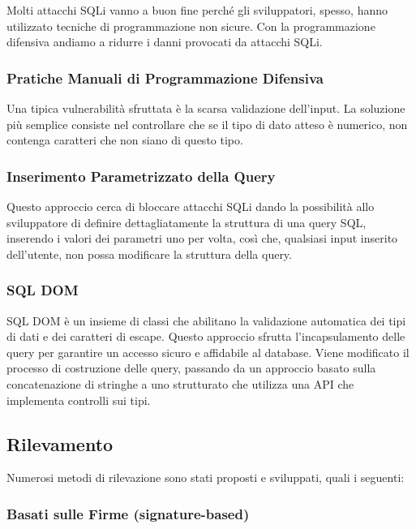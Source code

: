 Molti attacchi SQLi vanno a buon fine perché gli sviluppatori, spesso, hanno utilizzato tecniche di programmazione non sicure. Con la programmazione difensiva andiamo a ridurre i danni provocati da attacchi SQLi.

\subsubsection{Pratiche Manuali di Programmazione Difensiva}

Una tipica vulnerabilità sfruttata è la scarsa validazione dell'input. La soluzione più semplice consiste nel controllare che se il tipo di dato atteso è numerico, non contenga caratteri che non siano di questo tipo.

\subsubsection{Inserimento Parametrizzato della Query}

Questo approccio cerca di bloccare attacchi SQLi dando la possibilità allo sviluppatore di definire dettagliatamente la struttura di una query SQL, inserendo i valori dei parametri uno per volta, così che, qualsiasi input inserito dell'utente, non possa modificare la struttura della query.

\subsubsection{SQL DOM}

SQL DOM è un insieme di classi che abilitano la validazione automatica dei tipi di dati e dei caratteri di escape. Questo approccio sfrutta l'incapsulamento delle query per garantire un accesso sicuro e affidabile al database. Viene modificato il processo di costruzione delle query, passando da un approccio basato sulla concatenazione di stringhe a uno strutturato che utilizza una API che implementa controlli sui tipi.

\subsection{Rilevamento}

Numerosi metodi di rilevazione sono stati proposti e sviluppati, quali i seguenti:

\subsubsection{Basati sulle Firme (signature-based)}

